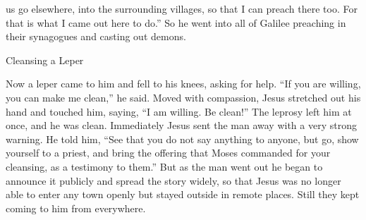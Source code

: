 {us go
elsewhere,
into
the surrounding villages,
so that
I can preach
there
too.
For
that is what I came out here to do.”
So
he went
into
all
of Galilee
preaching
in
their
synagogues
and
casting out
demons.
\par }{\SH Cleansing a Leper
\par }{\PP {}Now
a leper
came
to
him
and
fell to
his knees,
asking for help.
“If
you are willing,
you can make
me
clean,”
he said.
Moved with compassion,
Jesus stretched out
his
hand
and touched
him, saying,
“I am willing.
Be clean!”
The leprosy
left
him
at once,
and
he was clean.
Immediately
Jesus sent
the man
away
with a very strong warning.
He
told
him, “See
that you do
not
say
anything to anyone, but
go,
show
yourself
to a priest,
and
bring the offering
that
Moses
commanded
for
your
cleansing,
as
a testimony
to them.”
But
as
the man went out
he began
to announce
it publicly
and
spread
the story
widely, so that
Jesus was no longer
able
to enter
any town
openly
but
stayed outside
in
remote
places.
Still they kept coming
to
him
from everywhere.

}
